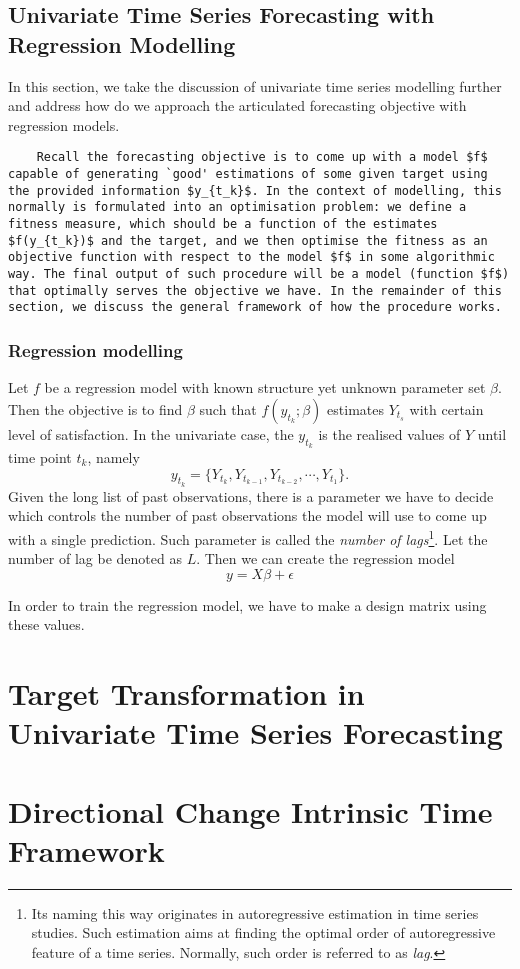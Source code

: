 \subsection{Univariate Time Series Forecasting with Regression Modelling}
In this section, we take the discussion of univariate time series modelling further and address how do we approach the articulated forecasting objective with regression models.

\begin{verbatim}
    Recall the forecasting objective is to come up with a model $f$ capable of generating `good' estimations of some given target using the provided information $y_{t_k}$. In the context of modelling, this normally is formulated into an optimisation problem: we define a fitness measure, which should be a function of the estimates $f(y_{t_k})$ and the target, and we then optimise the fitness as an objective function with respect to the model $f$ in some algorithmic way. The final output of such procedure will be a model (function $f$) that optimally serves the objective we have. In the remainder of this section, we discuss the general framework of how the procedure works.
\end{verbatim}

\subsubsection{Regression modelling}
Let $f$ be a regression model with known structure yet unknown parameter set $\beta$. Then the objective is to find $\beta$ such that $f(y_{t_k}; \beta)$ estimates $Y_{t_s}$ with certain level of satisfaction. In the univariate case, the $y_{t_k}$ is the realised values of $Y$ until time point $t_k$, namely
\begin{equation*}
    y_{t_k} = \{ Y_{t_k}, Y_{t_{k-1}}, Y_{t_{k-2}}, \cdots, Y_{t_1} \}.
\end{equation*}
Given the long list of past observations, there is a parameter we have to decide which controls the number of past observations the model will use to come up with a single prediction. Such parameter is called the \textit{number of lags}\footnote{Its naming this way originates in autoregressive estimation in time series studies. Such estimation aims at finding the optimal order of autoregressive feature of a time series. Normally, such order is referred to as \textit{lag}.}. Let the number of lag be denoted as $L$. Then we can create the regression model
\begin{equation*}
    y = X \beta + \epsilon
\end{equation*}


In order to train the regression model, we have to make a design matrix using these values.


\section{Target Transformation in Univariate Time Series Forecasting}


\section{Directional Change Intrinsic Time Framework}
